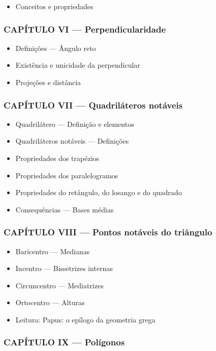 \documentclass[a4paper,12pt]{article}[abntex2]
\begin{document}
\begin{itemize}
\item Conceitos e propriedades
\end{itemize}
\subsubsection*{CAPÍTULO VI — Perpendicularidade}

\begin{itemize}
\item Definições — Ângulo reto
\item Existência e unicidade da perpendicular
\item Projeções e distância
\end{itemize}
\subsubsection*{CAPÍTULO VII — Quadriláteros notáveis}

\begin{itemize}
\item Quadrilátero — Definição e elementos
\item Quadriláteros notáveis — Definições
\item Propriedades dos trapézios
\item Propriedades dos paralelogramos
\item Propriedades do retângulo, do losango e do quadrado
\item Consequências — Bases médias
\end{itemize}
\subsubsection*{CAPÍTULO VIII — Pontos notáveis do triângulo}

\begin{itemize}
\item Baricentro — Medianas
\item Incentro — Bissetrizes internas
\item Circuncentro — Mediatrizes
\item Ortocentro — Alturas
\item Leitura: Papus: o epílogo da geometria grega
\end{itemize}
\subsubsection*{CAPÍTULO IX — Polígonos}
\end{document}

